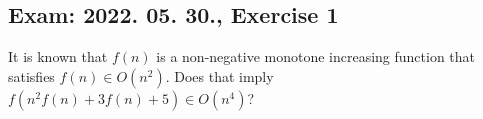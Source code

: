 \subsection{Exam: 2022. 05. 30., Exercise 1}


It is known that $f(n)$ is a non-negative monotone increasing function that
satisfies $f(n) \in{} O(n^2)$. Does that imply $f(n^2f(n)+3f(n)+5) \in{} O(n^4)$?



